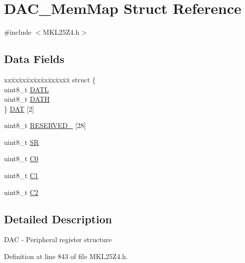 \hypertarget{struct_d_a_c___mem_map}{}\section{D\+A\+C\+\_\+\+Mem\+Map Struct Reference}
\label{struct_d_a_c___mem_map}


{\ttfamily \#include $<$M\+K\+L25\+Z4.\+h$>$}

\subsection*{Data Fields}
\begin{DoxyCompactItemize}
\item 
\begin{tabbing}
xx\=xx\=xx\=xx\=xx\=xx\=xx\=xx\=xx\=\kill
struct \{\\
\>uint8\_t \hyperlink{struct_d_a_c___mem_map_a5e154a0937bc5d4879efb1fd80f713f0}{DATL}\\
\>uint8\_t \hyperlink{struct_d_a_c___mem_map_ab05302bfcc5f26e258870c56bbdb52b8}{DATH}\\
\} \hyperlink{struct_d_a_c___mem_map_a87da01d78bace641b9002755d83af3fb}{DAT} \mbox{[}2\mbox{]}\\

\end{tabbing}\item 
uint8\+\_\+t \hyperlink{struct_d_a_c___mem_map_a96f86316418a3a382f0552a7e2f4b3c1}{R\+E\+S\+E\+R\+V\+E\+D\+\_} \mbox{[}28\mbox{]}
\item 
uint8\+\_\+t \hyperlink{struct_d_a_c___mem_map_a146115dd60e5e34ce6f1d8dc2b860877}{SR}
\item 
uint8\+\_\+t \hyperlink{struct_d_a_c___mem_map_a101597fee641d461b61f0c02c90ef703}{C0}
\item 
uint8\+\_\+t \hyperlink{struct_d_a_c___mem_map_a29c8fe336000ac0b40c05c444be3bc1b}{C1}
\item 
uint8\+\_\+t \hyperlink{struct_d_a_c___mem_map_a8c2e7ea3f41f7b867578fdec48b4dacc}{C2}
\end{DoxyCompactItemize}


\subsection{Detailed Description}
D\+AC -\/ Peripheral register structure 

Definition at line 843 of file M\+K\+L25\+Z4.\+h.



